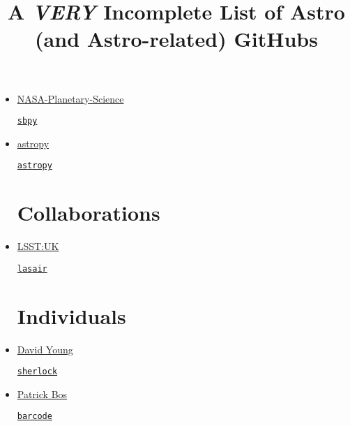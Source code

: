 \documentclass[11pt,a4paper]{article}
\begin{document}
\title{A {\it VERY} Incomplete List of Astro (and Astro-related) GitHubs}
\maketitle



\begin{itemize}


\section*{Organisations}  

\item \href{https://github.com/NASA-Planetary-Science}{NASA-Planetary-Science}
  \begin{itemize}
    \href{https://github.com/NASA-Planetary-Science/sbpy}{{\tt sbpy}}
  \end{itemize}
  
\item \href{https://github.com/astropy}{astropy}
  \begin{itemize}
    \href{https://github.com/astropy/astropy}{{\tt astropy}}
  \end{itemize}


\section*{Collaborations}  
\item \href{https://github.com/lsst-uk}{LSST:UK}
  \begin{itemize}
    \href{https://github.com/lsst-uk/lasair/}{{\tt lasair}}
  \end{itemize}
  
  
\section*{Individuals}  
\item \href{https://github.com/thespacedoctor}{David Young}
  \begin{itemize}
    \href{https://github.com/thespacedoctor/sherlock}{{\tt sherlock}}
  \end{itemize}
  
\item \href{https://github.com/egpbos}{Patrick Bos}
  \begin{itemize}
    \href{https://github.com/egpbos/barcode}{{\tt barcode}}
  \end{itemize}
  

\end{itemize}
\end{document}
